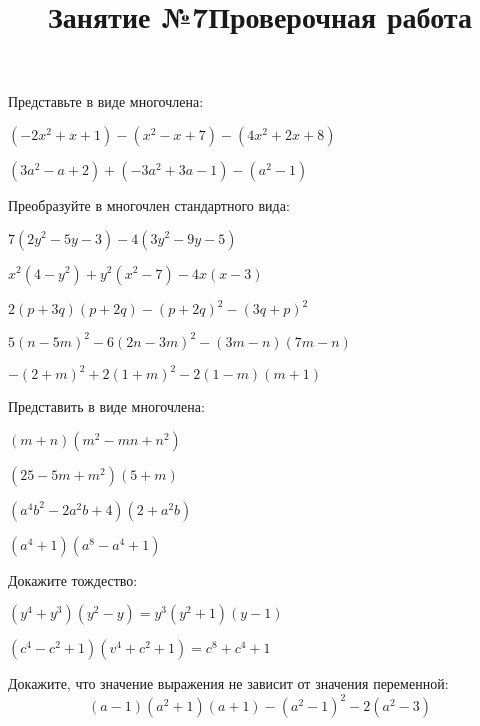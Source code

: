 \newpage
\title{Занятие №7}
\begin{listofex}
	\item Представьте в виде многочлена:
	\begin{enumcols}[itemcolumns=1]
		\item \( (-2x^2+x+1)-(x^2-x+7)-(4x^2+2x+8) \)
		\item \( (3a^2-a+2)+(-3a^2+3a-1)-(a^2-1) \)
	\end{enumcols}
	\item Преобразуйте в многочлен стандартного вида:
	\begin{enumcols}[itemcolumns=2]
		\item \( 7(2y^2-5y-3)-4(3y^2-9y-5) \)
		\item \( x^2(4-y^2)+y^2(x^2-7)-4x(x-3) \)
		\item \( 2(p+3q)(p+2q)-(p+2q)^2-(3q+p)^2 \)
		\item \( 5(n-5m)^2-6(2n-3m)^2-(3m-n)(7m-n) \)
		\item \( -(2+m)^2+2(1+m)^2-2(1-m)(m+1) \)
	\end{enumcols}
	\item Представить в виде многочлена:
	\begin{enumcols}[itemcolumns=2]
		\item \( (m+n)(m^2-mn+n^2) \)
		\item \( (25-5m+m^2)(5+m) \)
		\item \( (a^4b^2-2a^2b+4)(2+a^2b) \)
		\item \( (a^4+1)(a^8-a^4+1) \)
	\end{enumcols}
	\item Докажите тождество:
	\begin{enumcols}[itemcolumns=2]
		\item \( (y^4+y^3)(y^2-y)=y^3(y^2+1)(y-1) \)
		\item \( (c^4-c^2+1)(v^4+c^2+1)=c^8+c^4+1 \)
	\end{enumcols}
	\item Докажите, что значение выражения не зависит от значения переменной:
	\[ (a-1)(a^2+1)(a+1)-(a^2-1)^2-2(a^2-3) \]
\end{listofex}
\newpage
\title{Проверочная работа}
